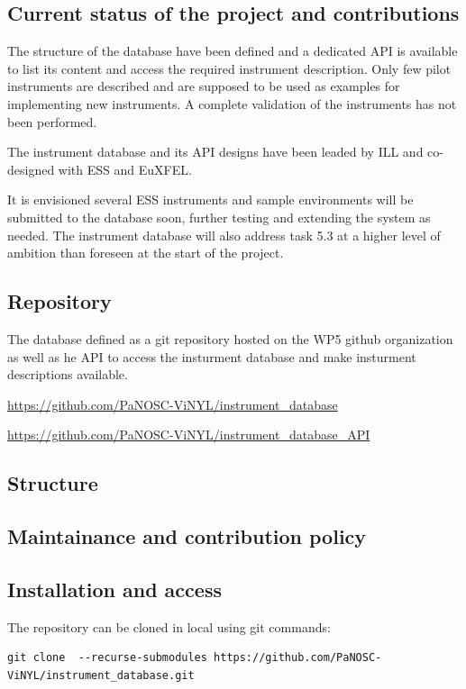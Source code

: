 \documentclass[11pt, a4paper]{article}
\begin{document}
\subsection{Current status of the project and contributions}
The structure of the database have been defined and a dedicated API is available to list its content and access the required instrument description.
Only few pilot instruments are described and are supposed to be used as examples for implementing new instruments.
A complete validation of the instruments has not been performed.

The instrument database and its API designs have been leaded by ILL and co-designed with ESS and EuXFEL.

It is envisioned several ESS instruments and sample environments will be submitted to the database soon, further testing and extending the system as needed. The instrument database will also address task 5.3 at a higher level of ambition than foreseen at the start of the project.

\subsection{Repository}
The database defined as a git repository hosted on the WP5 github organization as well as
he API to access the insturment database and make insturment descriptions available.

\href{https://github.com/PaNOSC-ViNYL/instrument_database}{https://github.com/PaNOSC-ViNYL/instrument\_database}


\href{https://github.com/PaNOSC-ViNYL/instrument_database_API}{https://github.com/PaNOSC-ViNYL/instrument\_database\_API}

\subsection{Structure}
\subsection{Maintainance and contribution policy}

\subsection{Installation and access}
The repository can be cloned in local using git commands:
\begin{verbatim}
git clone  --recurse-submodules https://github.com/PaNOSC-ViNYL/instrument_database.git
\end{verbatim}
\end{document}
